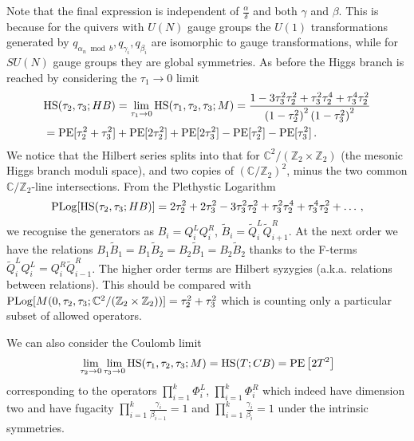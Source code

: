 \documentclass[main.tex]{subfiles}
\begin{document}
Note that the final expression is independent of $\frac{\alpha}{\delta}$ and both $\gamma$ and $\beta$. This is because for the quivers with $U(N)$ gauge groups the $U(1)$ transformations generated by $q_{\alpha_n\bmod b},q_{\gamma_i},q_{\beta_i}$ are isomorphic to gauge transformations, while for $SU(N)$ gauge groups they are global symmetries. 
As before the Higgs branch is reached by considering the $\tau_1\to0$ limit 
\begin{equation}
\begin{aligned}
&\textrm{HS}(\tau_2,\tau_3;HB)=\lim_{\tau_1\to0}\textrm{HS}(\tau_1,\tau_2,\tau_3;M)=\frac{1-3 \tau _3^2 \tau _2^2+\tau _3^2 \tau _2^4+\tau _3^4 \tau _2^2}{\left(1-\tau _2^2\right)^2 \left(1-\tau _3^2\right)^2}\label{eqn:HSU14}\\
&=\operatorname{\mathrm{PE}}[\tau_2^2+\tau_3^2]+\operatorname{\mathrm{PE}}[2\tau_2^2]+\operatorname{\mathrm{PE}}[2\tau_3^2]-\operatorname{\mathrm{PE}}[\tau_2^2]-\operatorname{\mathrm{PE}}[\tau_3^2]\,.
\end{aligned}
\end{equation}
We notice that the Hilbert series splits into that for $\mathbb{C}^2/(\mathbb{Z}_2\times\mathbb{Z}_2)$ (the mesonic Higgs branch moduli space), and two copies of $(\mathbb{C}/\mathbb{Z}_2)^2$, minus the two common $\mathbb{C}/\mathbb{Z}_2$-line intersections.
From the Plethystic Logarithm 
\begin{equation}
\operatorname{\mathrm{PLog}}[\textrm{HS}(\tau_2,\tau_3;HB)]=2 \tau _2^2+2
   \tau _3^2-3 \tau _3^2 \tau _2^2+\tau _3^2 \tau _2^4+\tau _3^4 \tau _2^2+\dots\,,
\end{equation}
we recognise the generators as $B_i=Q_i^LQ_i^R$, $\widetilde{B}_i=\widetilde{Q}^L_{i}\widetilde{Q}^R_{i+1}$. At the next order we have the relations $B_1\widetilde{B}_1=B_1\widetilde{B}_2=B_2\widetilde{B}_1=B_2\widetilde{B}_2$ thanks to the F-terms $\widetilde{Q}_i^LQ_i^L=Q_{i}^R\widetilde{Q}_{i-1}^R$. The higher order terms are Hilbert syzygies (a.k.a. relations between relations). This should be compared with $\operatorname{\mathrm{PLog}}[M(0,\tau_2,\tau_3;\mathbb{C}^2/(\mathbb{Z}_2\times\mathbb{Z}_2))]=\tau_2^2+\tau_3^2$ which is counting only a particular subset of allowed operators.

We can also consider the Coulomb limit
\begin{equation}
\lim_{\tau_2\to0}\lim_{\tau_3\to0}\textrm{HS}(\tau_1,\tau_2,\tau_3;M)=\textrm{HS}(T;CB)=\operatorname{\mathrm{PE}}\left[2T^2\right]
\end{equation}
corresponding to the operators $\prod_{i=1}^k\Phi_{i}^L$, $\prod_{i=1}^k\Phi^R_{i}$ which indeed have dimension two and have fugacity $\prod_{i=1}^k\frac{\gamma_i}{\beta_{i-1}}=1$ and $\prod_{i=1}^k\frac{\gamma_i}{\beta_{i}}=1$ under the intrinsic symmetries.
\end{document}
